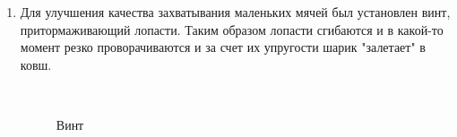 \begin{enumerate}
	\item Для улучшения качества захватывания маленьких мячей был установлен винт, притормаживающий лопасти. Таким образом лопасти сгибаются и в какой-то момент резко проворачиваются и за счет их упругости шарик "залетает" в ковш.
	\begin{figure}[H]
		\begin{minipage}[h]{0.2\linewidth}
			\center  
		\end{minipage}
		\begin{minipage}[h]{0.6\linewidth}
			\caption{Винт}
		\end{minipage}
	\end{figure}
	

\end{enumerate}

